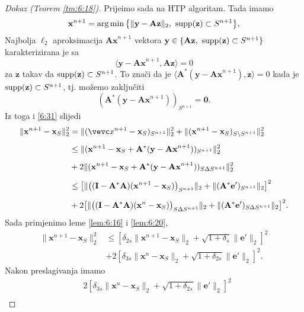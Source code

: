 \documentclass[a4paper,twoside,12pt]{memoir} %
\newcommand{\vect}[1]{\mathbf{#1}}
\renewcommand{\vec}{\vect}
\newcommand{\supp}{\text{\normalfont{supp}}}
\newcommand{\norm}[1]{\|{#1}\|}
\DeclareMathOperator*{\argmin}{arg\,min}
\begin{document}
\begin{proof}[Dokaz (Teorem \ref{tm:6:18})]
    \indent
    Prije\dj imo sada na HTP algoritam. Tada imamo
    \begin{equation*}
        \vec x^{n+1} = \argmin \big\{ \norm{\vec y - \vec{Az}}_2,\ \supp(\vec z) \subset S^{n+1} \big\},
    \end{equation*}
    Najbolja $\ell_2$ aproksimacija $\vec {Ax}^{n+1}$ vektora $\vec y \in \{\vec{Az},\ \supp(\vec z) \subset S^{n+1}\}$ karakterizirana je sa
    \begin{equation*}
        \langle \vec y - \vec {Ax}^{n+1}, \vec{Az} \rangle = 0 
    \end{equation*}
    za $\vec z$ takav da $\supp(\vec z) \subset S^{n+1}$. To zna\v{c}i da je $\langle \vec A^*(\vec y - \vec{Ax}^{n+1}), \vec z \rangle = 0$ kada je $\supp(\vec z) \subset S^{n+1}$, tj. mo\v{z}emo zaklju\v{c}iti
    \begin{equation*}
        (\vec A^*(\vec y - \vec {Ax}^{n+1}))_{S^{n+1}} = \vec 0.
    \end{equation*}
    Iz toga i \eqref{6:31} slijedi
    \begin{align*}
        \norm{\vec x^{n+1} - \vec x_S}_2^2 & = \norm{(\vevc x^{n+1} - \vec x_S)_{S^{n+1}}}_2^2 + \norm{(\vec x^{n+1} - \vec x_S)_{S \backslash S^{n+1}}}_2^2\\[0.5em]
        & \leq \norm{(\vec x^{n+1} - \vec x_S + \vec A^*(\vec y - \vec {Ax}^{n+1}))_{S^{n+1}}}_2^2\\[0.5em]
        & + 2 \norm{(\vec x^{n+1} - \vec x_S + \vec A^*(\vec y - \vec {Ax}^{n+1}))_{S \Delta S^{n+1}}}_2^2\\[0.5em]
        & \leq \big[ \norm{\big( (\vec I - \vec A^* \vec A)(\vec x^{n+1} - \vec x_S) \big)_{S^{n+1}}}_2 + \norm{(\vec A^* \vec e')_{S^{n+1}}}_2 \big]^2\\[0.5em]
        & + 2 \big[ \norm{ \big( (\vec I - \vec A^* \vec A)(\vec x^n - \vec x_S) \big)_{S \Delta S^{n+1}} }_2 + \norm{(\vec A^* \vec e')_{S \Delta S^{n+1}}}_2 \big]^2.
    \end{align*}
    Sada primjenimo leme \ref{lem:6:16} i \ref{lem:6:20},
    \begin{align*}
    \norm{\vec x^{n+1} - \vec x_S}_2^2 & \leq [\delta_{2s} \norm{\vec x^{n+1} - \vec x_S}_2 + \sqrt{1+\delta_s} \norm{\vec e'}_2]^2\\[0.5em]
    & + 2 [\delta_{3s} \norm{\vec x^n - \vec x_S}_2 + \sqrt{1 + \delta_{2s}} \norm{\vec e'}_2]^2.
    \end{align*}
    Nakon preslagivanja imamo
    \begin{align*}
        &2[\delta_{3s} \norm{\vec x^n - \vec x_S}_2 + \sqrt{1 + \delta_{2s}} \norm{\vec e '}_2]^2\\[0.5em]

\end{align*}
\end{proof}
\end{document}
